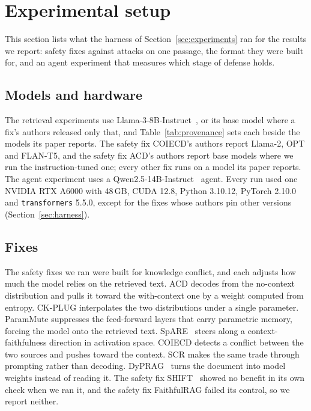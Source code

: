 \section{Experimental setup}
\label{sec:setup}

This section lists what the harness of Section~\ref{sec:experiments} ran for
the results we report: safety fixes against attacks on one passage, the
format they were built for, and an agent experiment that measures which stage
of defense holds.

\subsection{Models and hardware}
\label{sec:whatweran}

The retrieval experiments use Llama-3-8B-Instruct~\cite{grattafiori-2024-llama3},
or its base model where a fix's authors released only that, and
Table~\ref{tab:provenance} sets each beside the models its paper reports.
The safety fix COIECD's authors report Llama-2, OPT and FLAN-T5, and the safety
fix ACD's authors report base models where we run the instruction-tuned one;
every other fix runs on a model its paper reports. The agent experiment uses a
Qwen2.5-14B-Instruct~\cite{qwen-2024-qwen25} agent. Every run used one NVIDIA
RTX A6000 with 48\,GB, CUDA 12.8, Python 3.10.12, PyTorch 2.10.0 and
\texttt{transformers} 5.5.0, except for the fixes whose authors pin other
versions (Section~\ref{sec:harness}).

\subsection{Fixes}
\label{sec:defenses}

The safety fixes we ran were built for knowledge conflict, and each adjusts
how much the model relies on the retrieved text. ACD decodes from the
no-context distribution and pulls it toward the with-context one by a weight
computed from entropy. CK-PLUG interpolates the two distributions under a
single parameter. ParamMute suppresses the feed-forward layers that carry
parametric memory, forcing the model onto the retrieved text.
SpARE~\cite{zhao-2024-steering} steers along a context-faithfulness direction
in activation space. COIECD detects a conflict between the two sources and
pushes toward the context. SCR makes the same trade through prompting rather
than decoding. DyPRAG~\cite{tan-2025-dynamic} turns the document into model
weights instead of reading it. The safety fix SHIFT~\cite{li-2026-shift}
showed no benefit in its own check when we ran it, and the safety fix
FaithfulRAG failed its control, so we report neither.

